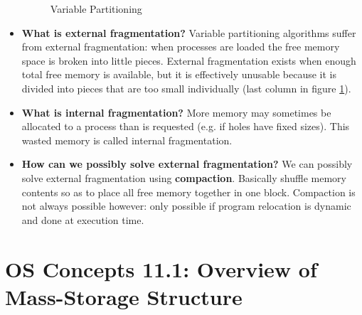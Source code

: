 \documentclass[12pt]{article}
\begin{document}
\begin{itemize}
\begin{figure}[ht]
            \caption{Variable Partitioning}
            \label{fig:variable-partitioning}
        \end{figure}
    \item \textbf{What is external fragmentation?} Variable partitioning algorithms suffer from external fragmentation: when processes are loaded the free memory space is broken into little pieces. External fragmentation exists when enough total free memory is available, but it is effectively unusable because it is divided into pieces that are too small individually (last column in figure \ref{fig:variable-partitioning}).
    \item \textbf{What is internal fragmentation?} More memory may sometimes be allocated to a process than is requested (e.g. if holes have fixed sizes). This wasted memory is called internal fragmentation.
    \item \textbf{How can we possibly solve external fragmentation?} We can possibly solve external fragmentation using \textbf{compaction}. Basically shuffle memory contents so as to place all free memory together in one block. Compaction is not always possible however: only possible if program relocation is dynamic and done at execution time.
\end{itemize}

\section*{OS Concepts 11.1: Overview of Mass-Storage Structure}
\end{document}
